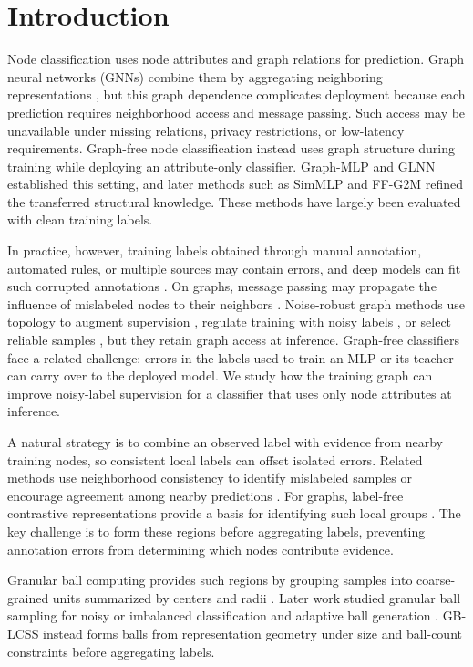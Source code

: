 \documentclass[times,review,10pt]{elsarticle}
\theoremstyle{definition}
\theoremstyle{plain}
\begin{document}
\section{Introduction}\label{sec:1}

Node classification uses node attributes and graph relations for prediction. Graph neural networks (GNNs) combine them by aggregating neighboring representations \cite{ref1}, but this graph dependence complicates deployment because each prediction requires neighborhood access and message passing. Such access may be unavailable under missing relations, privacy restrictions, or low-latency requirements. Graph-free node classification instead uses graph structure during training while deploying an attribute-only classifier. Graph-MLP \cite{ref3} and GLNN \cite{ref4} established this setting, and later methods such as SimMLP \cite{ref41} and FF-G2M \cite{ref45} refined the transferred structural knowledge. These methods have largely been evaluated with clean training labels.

In practice, however, training labels obtained through manual annotation, automated rules, or multiple sources may contain errors, and deep models can fit such corrupted annotations \cite{ref24}. On graphs, message passing may propagate the influence of mislabeled nodes to their neighbors \cite{ref6}. Noise-robust graph methods use topology to augment supervision \cite{ref7}, regulate training with noisy labels \cite{ref8}, or select reliable samples \cite{ref9}, but they retain graph access at inference. Graph-free classifiers face a related challenge: errors in the labels used to train an MLP or its teacher can carry over to the deployed model. We study how the training graph can improve noisy-label supervision for a classifier that uses only node attributes at inference.

A natural strategy is to combine an observed label with evidence from nearby training nodes, so consistent local labels can offset isolated errors. Related methods use neighborhood consistency to identify mislabeled samples or encourage agreement among nearby predictions \cite{ref10,ref11}. For graphs, label-free contrastive representations provide a basis for identifying such local groups \cite{ref12}. The key challenge is to form these regions before aggregating labels, preventing annotation errors from determining which nodes contribute evidence.

Granular ball computing provides such regions by grouping samples into coarse-grained units summarized by centers and radii \cite{ref13}. Later work studied granular ball sampling for noisy or imbalanced classification \cite{ref15} and adaptive ball generation \cite{ref16}. GB-LCSS instead forms balls from representation geometry under size and ball-count constraints before aggregating labels.
\end{document}
